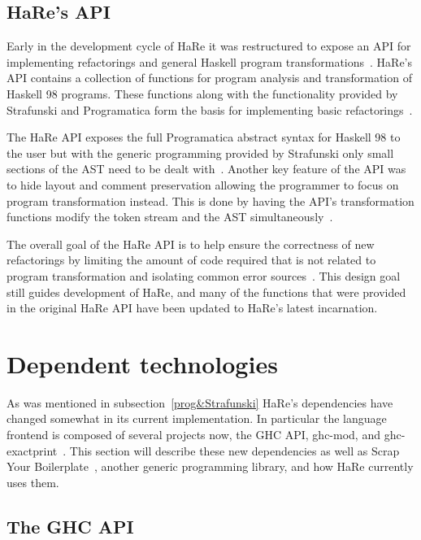\subsection{HaRe's API}\label{hareApi}

Early in the development cycle of HaRe it was restructured to expose an API for implementing refactorings and general Haskell program transformations~\citep{hareApi}. HaRe's API contains a collection of functions for program analysis and transformation of Haskell 98 programs. These functions along with the functionality provided by Strafunski and Programatica form the basis for implementing basic refactorings~\citep{hareApi}.

The HaRe API exposes the full Programatica abstract syntax for Haskell 98 to the user but with the generic programming provided by Strafunski only small sections of the AST need to be dealt with~\citep{hareApi}. Another key feature of the API was to hide layout and comment preservation allowing the programmer to focus on program transformation instead. This is done by having the API's transformation functions modify the token stream and the AST simultaneously~\citep{hareApi}. 

The overall goal of the HaRe API is to help ensure the correctness of new refactorings by limiting the amount of code required that is not related to program transformation and isolating common error sources~\citep{hareApi}. This design goal still guides development of HaRe, and many of the functions that were provided in the original HaRe API have been updated to HaRe's latest incarnation. 
 
\section{Dependent technologies}

As was mentioned in subsection~\ref{prog&Strafunski} HaRe's dependencies have changed somewhat in its current implementation. In particular the language frontend is composed of several projects now, the GHC API, ghc-mod, and ghc-exactprint~\citep{ghcApi,ghcMod,exactprint}. This section will describe these new dependencies as well as Scrap Your Boilerplate~\citep{syb}, another generic programming library, and how HaRe currently uses them.

\subsection{The GHC API}


